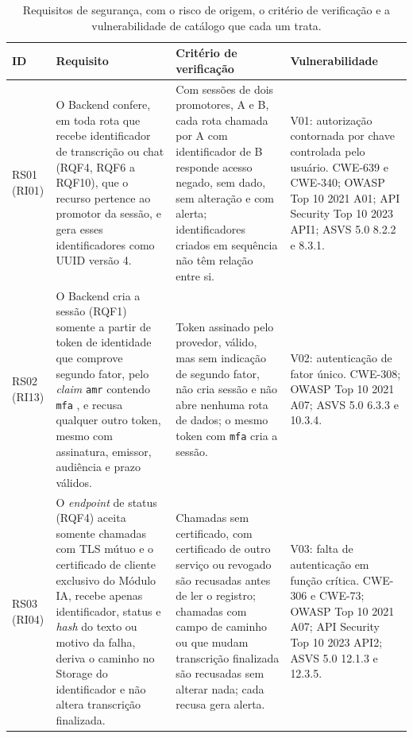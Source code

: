 \documentclass[12pt]{article}
\begin{document}
    \begin{table}[htbp]
        \centering
        \caption{Requisitos de segurança, com o risco de origem, o critério de verificação e a vulnerabilidade de catálogo que cada um trata.}
        \label{tab:requisitos}
        \footnotesize
        \setlength{\tabcolsep}{4pt}
        \begin{tabular}{|p{1.3cm}|p{4.3cm}|p{4.2cm}|p{3.7cm}|}
            \hline
            \textbf{ID} & \textbf{Requisito} & \textbf{Critério de verificação} & \textbf{Vulnerabilidade} \\
            \hline
            RS01 (RI01) & O Backend confere, em toda rota que recebe identificador de transcrição ou chat (RQF4, RQF6 a RQF10), que o recurso pertence ao promotor da sessão, e gera esses identificadores como UUID versão 4. & Com sessões de dois promotores, A e B, cada rota chamada por A com identificador de B responde acesso negado, sem dado, sem alteração e com alerta; identificadores criados em sequência não têm relação entre si. & V01: autorização contornada por chave controlada pelo usuário. CWE-639 e CWE-340; OWASP Top 10 2021 A01; API Security Top 10 2023 API1; ASVS 5.0 8.2.2 e 8.3.1. \\
            \hline
            RS02 (RI13) & O Backend cria a sessão (RQF1) somente a partir de token de identidade que comprove segundo fator, pelo \textit{claim} \texttt{amr} contendo \texttt{mfa} \cite{rfc8176}, e recusa qualquer outro token, mesmo com assinatura, emissor, audiência e prazo válidos. & Token assinado pelo provedor, válido, mas sem indicação de segundo fator, não cria sessão e não abre nenhuma rota de dados; o mesmo token com \texttt{mfa} cria a sessão. & V02: autenticação de fator único. CWE-308; OWASP Top 10 2021 A07; ASVS 5.0 6.3.3 e 10.3.4. \\
            \hline
            RS03 (RI04) & O \textit{endpoint} de status (RQF4) aceita somente chamadas com TLS mútuo e o certificado de cliente exclusivo do Módulo IA, recebe apenas identificador, status e \textit{hash} do texto ou motivo da falha, deriva o caminho no Storage do identificador e não altera transcrição finalizada. & Chamadas sem certificado, com certificado de outro serviço ou revogado são recusadas antes de ler o registro; chamadas com campo de caminho ou que mudam transcrição finalizada são recusadas sem alterar nada; cada recusa gera alerta. & V03: falta de autenticação em função crítica. CWE-306 e CWE-73; OWASP Top 10 2021 A07; API Security Top 10 2023 API2; ASVS 5.0 12.1.3 e 12.3.5. \\
            \hline
        \end{tabular}
    \end{table}
\end{document}
